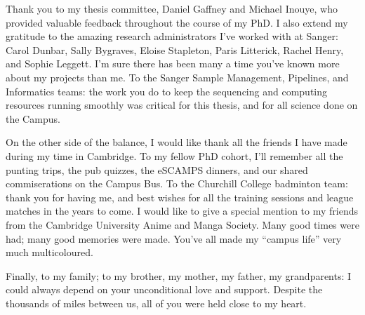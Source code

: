 Thank you to my thesis committee, Daniel Gaffney and Michael Inouye, who provided valuable feedback throughout the course of my PhD.
I also extend my gratitude to the amazing research administrators I've worked with at Sanger: Carol Dunbar, Sally Bygraves, Eloise Stapleton, Paris Litterick, Rachel Henry, and Sophie Leggett.
I'm sure there has been many a time you've known more about my projects than me. 
To the Sanger Sample Management, Pipelines, and Informatics teams:
the work you do to keep the sequencing and computing resources running smoothly was critical for this thesis, and for all science done on the Campus.

On the other side of the balance, I would like thank all the friends I have made during my time in Cambridge.
To my fellow PhD cohort, 
I'll remember all the punting trips, the pub quizzes, the eSCAMPS dinners,
and our shared commiserations on the Campus Bus.
To the Churchill College badminton team: thank you for having me, and best wishes for all the training sessions and league matches in the years to come.
I would like to give a special mention to my friends from the Cambridge University Anime and Manga Society.
Many good times were had; many good memories were made.
You've all made my \enquote{campus life} very much multicoloured.

Finally, to my family; to my brother, my mother, my father, my grandparents:
I could always depend on your unconditional love and support.
Despite the thousands of miles between us, 
all of you were held close to my heart.
%
